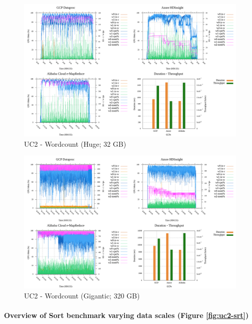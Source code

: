 \documentclass[review]{elsarticle}
\begin{document}
\begin{figure}[p]
	\caption{UC2 - Wordcount (Huge; 32 GB)}
	\label{fig:uc2-wrdcnt-h-cmidt}
	\includegraphics[width=\textwidth]{uc2-wrdcnt-h-cmidt}
	\centering
\end{figure}

\begin{figure}[p]
	\caption{UC2 - Wordcount (Gigantic; 320 GB)}
	\label{fig:uc2-wrdcnt-g-cmidt}
	\includegraphics[width=\textwidth]{uc2-wrdcnt-g-cmidt}
	\centering
\end{figure}

\paragraph{Overview of Sort benchmark varying data scales (Figure \ref{fig:uc2-srt})}
\end{document}
